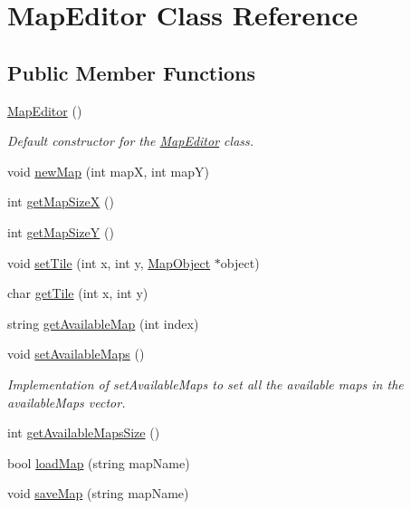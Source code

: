 \hypertarget{class_map_editor}{}\section{Map\+Editor Class Reference}
\label{class_map_editor}
\subsection*{Public Member Functions}
\begin{DoxyCompactItemize}
\item 
\hypertarget{class_map_editor_a293c325d0b53afcf3924f006cdf60363}{}\label{class_map_editor_a293c325d0b53afcf3924f006cdf60363} 
\hyperlink{class_map_editor_a293c325d0b53afcf3924f006cdf60363}{Map\+Editor} ()
\begin{DoxyCompactList}\small\item\em Default constructor for the \hyperlink{class_map_editor}{Map\+Editor} class. \end{DoxyCompactList}\item 
void \hyperlink{class_map_editor_a57870586b534b4fe8057d629ee367651}{new\+Map} (int mapX, int mapY)
\item 
int \hyperlink{class_map_editor_a9ba798e6bed9b9ccad9176e39a776c31}{get\+Map\+SizeX} ()
\item 
int \hyperlink{class_map_editor_a2f538a32e1f2de6f1ddd224e17838ec5}{get\+Map\+SizeY} ()
\item 
void \hyperlink{class_map_editor_a2cec645bc70378aa8523dc8b61abc6a9}{set\+Tile} (int x, int y, \hyperlink{class_map_object}{Map\+Object} $\ast$object)
\item 
char \hyperlink{class_map_editor_a9fee49a6d578b6f39766c4ed46707770}{get\+Tile} (int x, int y)
\item 
string \hyperlink{class_map_editor_a8aae2a9a39abc032084926d3bfa69980}{get\+Available\+Map} (int index)
\item 
\hypertarget{class_map_editor_aeb40daa3d6ab846255a07dc987447c9b}{}\label{class_map_editor_aeb40daa3d6ab846255a07dc987447c9b} 
void \hyperlink{class_map_editor_aeb40daa3d6ab846255a07dc987447c9b}{set\+Available\+Maps} ()
\begin{DoxyCompactList}\small\item\em Implementation of set\+Available\+Maps to set all the available maps in the available\+Maps vector. \end{DoxyCompactList}\item 
int \hyperlink{class_map_editor_a5bd8ac96b712380197b274de67bbb81e}{get\+Available\+Maps\+Size} ()
\item 
bool \hyperlink{class_map_editor_a00a6d6fe02c11f0aa9a4a8f844f1437a}{load\+Map} (string map\+Name)
\item 
void \hyperlink{class_map_editor_ac1e3e9bab1f285d9055b6cc610fa9114}{save\+Map} (string map\+Name)
\end{DoxyCompactItemize}


